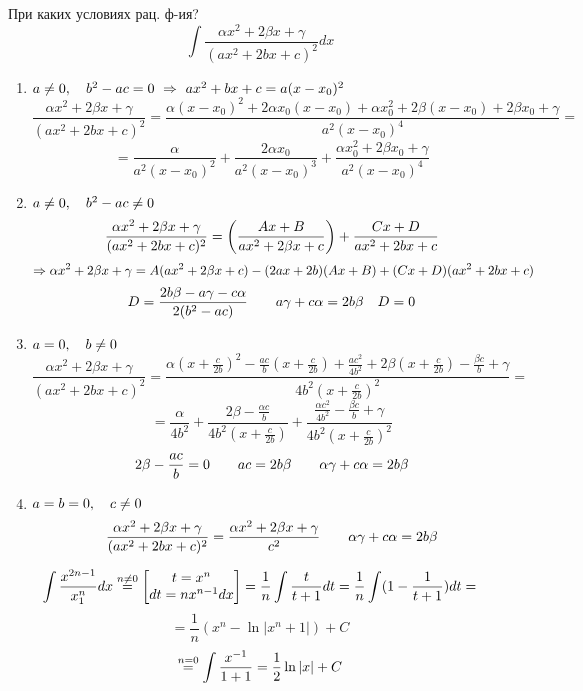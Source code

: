 \documentclass[main]{subfiles}
\begin{document}
    \begin{utv}
        При каких условиях рац. ф-ия?
        \[\int \frac{\alpha x^2 + 2 \beta x + \gamma}{(a x^2 + 2 bx + c)^2} dx\]
        \begin{enumerate}
            \item $a \neq 0,\quad b^2 - ac = 0 \ \Rightarrow\  ax^2 + bx + c = a(x - x_0)^2$
            \[\frac{\alpha x^2 + 2 \beta x + \gamma}{(ax^2 + 2bx + c)^2} = \frac{\alpha(x - x_0)^2 + 2 \alpha x_0 (x - x_0) + \alpha x_0^2 + 2 \beta (x - x_0) + 2 \beta x_0 + \gamma}{a^2 (x - x_0)^4} =\]
            \[= \frac{\alpha}{a^2 (x - x_0)^2} + \frac{2 \alpha x_0}{a^2 (x - x_0)^3} + \frac{\alpha x_0^2 + 2 \beta x_0 + \gamma}{a^2 (x - x_0)^4}\]
            \item $a \neq 0,\quad b^2 - ac \neq 0$
            \[\frac{\alpha x^2 + 2 \beta x + \gamma}{(ax^2 + 2bx + c)^2} = \left(\frac{Ax + B}{a x^2 + 2 \beta x + c}\right) + \frac{Cx + D}{ax^2 + 2bx + c}\]
            \[\Rightarrow \alpha x^2 + 2 \beta x + \gamma = A(ax^2 + 2 \beta x + c) - (2ax + 2b)(Ax + B) + (Cx + D)(ax^2 + 2bx + c)\]
            \[D = \frac{2b\beta - a\gamma - c\alpha}{2(b^2 - ac)} \qquad a\gamma + c\alpha = 2b\beta \quad D = 0\]
            \item $a = 0,\quad b \neq 0$
            \[\frac{\alpha x^2 + 2 \beta x + \gamma}{(ax^2 + 2bx + c)^2} = \frac{\alpha(x + \frac{c}{2b})^2 - \frac{ac}{b}(x + \frac{c}{2b}) + \frac{ac^2}{4b^2} + 2\beta(x + \frac{c}{2b}) - \frac{\beta c}{b} + \gamma}{4b^2 (x + \frac{c}{2b})^2} =\]
            \[= \frac{\alpha}{4b^2} + \frac{2\beta - \frac{\alpha c}{b}}{4b^2 (x + \frac{c}{2b})} + \frac{\frac{\alpha c^2}{4b^2} - \frac{\beta c}{b} + \gamma}{4b^2 (x + \frac{c}{2b})^2}\]
            \[2\beta - \frac{ac}{b} = 0\qquad ac = 2b\beta \qquad \alpha \gamma + c \alpha = 2 b \beta\]
            \item $a = b = 0,\quad c \neq 0$
            \[\frac{\alpha x^2 + 2 \beta x + \gamma}{(ax^2 + 2bx + c)^2} = \frac{\alpha x^2 + 2 \beta x + \gamma}{c^2} \qquad \alpha \gamma + c \alpha = 2 b \beta\]
        \end{enumerate}
    \end{utv}

    \begin{Example}
        \[\int \frac{x^{2n - 1}}{x^n _ 1} dx \overset{n \neq 0}{=} \left[\begin{matrix}
            t = x^n\\
            dt = n x^{n-1} dx
        \end{matrix}\right] = \frac{1}{n} \int \frac{t}{t + 1} dt = \frac{1}{n} \int (1 - \frac{1}{t + 1}) dt = \]
        \[ = \frac{1}{n} (x^n - \ln|x^n + 1|) + C\]
        \[\overset{n = 0}{=} \int \frac{x^{-1}}{1 + 1} = \frac{1}{2} \ln|x| + C\]
    \end{Example}
\end{document}
